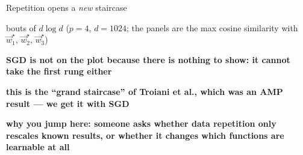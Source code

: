 \documentclass[aspectratio=169,11pt]{beamer}
\begin{document}
\begin{frame}{Repetition opens a \emph{new} staircase}
{\begin{notelist}
      bouts of $d\log d$ ($p = 4$, $d = 1024$; the panels are the max cosine
      similarity with $\vec{w}^\star_1$, $\vec{w}^\star_2$, $\vec{w}^\star_3$)
    \item \textbf{SGD is not on the plot because there is nothing to show: it
      cannot take the first rung either}
    \item \textbf{this is the ``grand staircase'' of Troiani et al., which was
      an AMP result --- we get it with SGD}
    \item \textbf{why you jump here: someone asks whether data repetition only
      rescales known results, or whether it changes which functions are
      learnable at all}
  \end{notelist}}
\end{frame}

%
%
%
\end{document}
